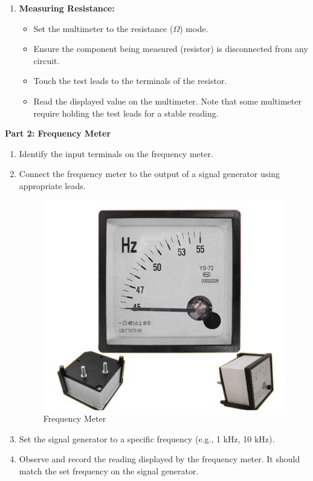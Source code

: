 \begin{enumerate}
    \item \textbf{Measuring Resistance:}
    \begin{itemize}
        \item Set the multimeter to the resistance ($\Omega$) mode.
        \item Ensure the component being measured (resistor) is disconnected from any circuit.
        \item Touch the test leads to the terminals of the resistor.
        \item Read the displayed value on the multimeter. Note that some multimeter require holding the test leads for a stable reading.
    \end{itemize}

\end{enumerate}

\noindent \textbf{Part 2: Frequency Meter}

\begin{enumerate}
    \item Identify the input terminals on the frequency meter.
    \item Connect the frequency meter to the output of a signal generator using appropriate leads.

    \begin{figure}[H]
        \centering
        \includegraphics[width=0.5\linewidth]{img/freq_meter.png}
        \caption{Frequency Meter}
        \label{fig:enter-label}
    \end{figure}
    
    \item Set the signal generator to a specific frequency (e.g., 1 kHz, 10 kHz).
    
    \item Observe and record the reading displayed by the frequency meter. It should match the set frequency on the signal generator.
\end{enumerate}

